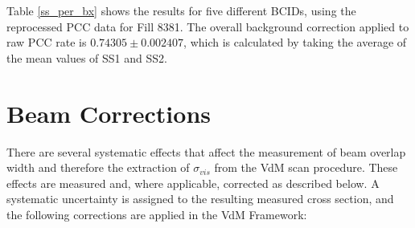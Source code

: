 Table  \ref{ss_per_bx} shows the results for five different BCIDs, using the reprocessed PCC data for Fill 8381.  The overall background correction applied to raw PCC rate is $0.74305 \pm 0.002407$, which is calculated by taking the average of the mean values of SS1 and SS2. 

\section{Beam Corrections}

There are several systematic effects that affect the measurement of beam overlap width and therefore the extraction of $\sigma_{vis}$ from the VdM scan procedure. These effects are measured and, where applicable, corrected as described below. A systematic uncertainty is assigned to the resulting measured cross section, and the following corrections are applied in the VdM Framework:
 
